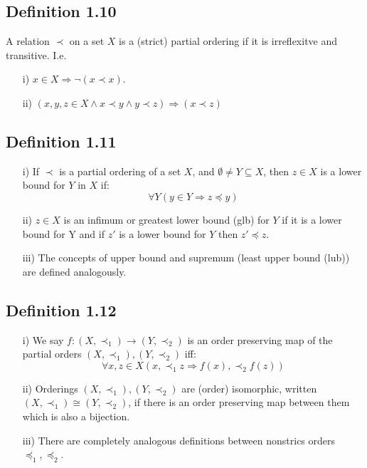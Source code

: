 \documentclass[a4paper, 12pt, twoside]{article}
\begin{document}
\subsection*{Definition 1.10}
A relation $\prec$ on a set $X$ is a (strict) partial ordering if it is irreflexitve and transitive. I.e.
\begin{itemize}
    \item[i)]$x\in X\Rightarrow \neg (x\prec x)$.
    \item[ii)] $(x,y,z\in X \wedge x \prec y \wedge y \prec z)\Rightarrow (x\prec z)$
\end{itemize}


\subsection*{Definition 1.11}
\begin{itemize}
    \item[i)] If $\prec$ is a partial ordering of a set $X$, and $\emptyset \neq Y \subseteq X$, then $z\in X$ is a lower bound for $Y$ in $X$ if:
    $$\forall Y(y\in Y\Rightarrow z \preceq y) $$
    \item[ii)] $z\in X$ is an infimum or greatest lower bound (glb) for $Y$ if it is a lower bound for Y and if $z'$ is a lower bound for $Y$ then $z'\preceq z$.
    \item[iii)] The concepts of upper bound and supremum (least upper bound (lub)) are defined analogously.
\end{itemize}
\subsection*{Definition 1.12}
\begin{itemize}
    \item[i)] We say $f:(X,\prec_{1})\to(Y,\prec_{2})$ is an order preserving map of the partial orders $(X,\prec_{1}),(Y,\prec_{2})$ iff:
    $$\forall x,z\in X (x,\prec_{1}z \Rightarrow f(x),\prec_{2}f(z)) $$
    \item[ii)] Orderings $(X,\prec_{1}),(Y,\prec_{2})$ are (order) isomorphic, written $(X,\prec_{1})\cong(Y,\prec_{2})$, if there is an order preserving map between them which is also a bijection.
    \item[iii)] There are completely analogous definitions between nonstrics orders $\preceq_{1}, \preceq_{2}$.
\end{itemize}
\end{document}
